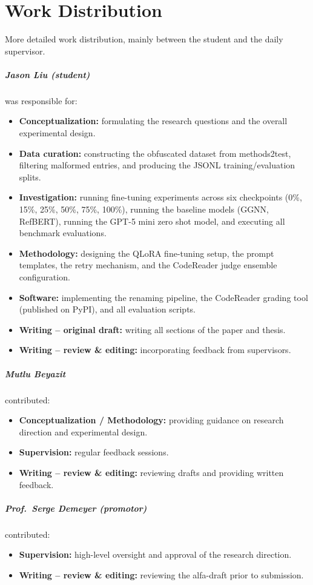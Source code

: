 
\chapter{Work Distribution}
\label{ch:work_distribution}

More detailed work distribution, mainly between the student and the daily supervisor.

\paragraph{Jason Liu (student)} was responsible for:
\begin{itemize}
  \item \textbf{Conceptualization:} formulating the research questions and the overall
        experimental design.
  \item \textbf{Data curation:} constructing the obfuscated dataset from methods2test,
        filtering malformed entries, and producing the JSONL training/evaluation splits.
  \item \textbf{Investigation:} running fine-tuning experiments across six checkpoints
        (0\%, 15\%, 25\%, 50\%, 75\%, 100\%), running the baseline models (GGNN, RefBERT), 
        running the GPT-5 mini zero shot model, and executing all benchmark evaluations.
  \item \textbf{Methodology:} designing the QLoRA fine-tuning setup, the prompt templates,
        the retry mechanism, and the CodeReader judge ensemble configuration.
  \item \textbf{Software:} implementing the renaming pipeline, the CodeReader grading tool
        (published on PyPI), and all evaluation scripts.
  \item \textbf{Writing -- original draft:} writing all sections of the paper and thesis.
  \item \textbf{Writing -- review \& editing:} incorporating feedback from supervisors.
\end{itemize}

\paragraph{Mutlu Beyazit} contributed:
\begin{itemize}
  \item \textbf{Conceptualization / Methodology:} providing guidance on research direction
        and experimental design.
  \item \textbf{Supervision:} regular feedback sessions.
  \item \textbf{Writing -- review \& editing:} reviewing drafts and providing written feedback.
\end{itemize}

\paragraph{Prof.\ Serge Demeyer (promotor)} contributed:
\begin{itemize}
  \item \textbf{Supervision:} high-level oversight and approval of the research direction.
  \item \textbf{Writing -- review \& editing:} reviewing the alfa-draft prior to submission.
\end{itemize}
